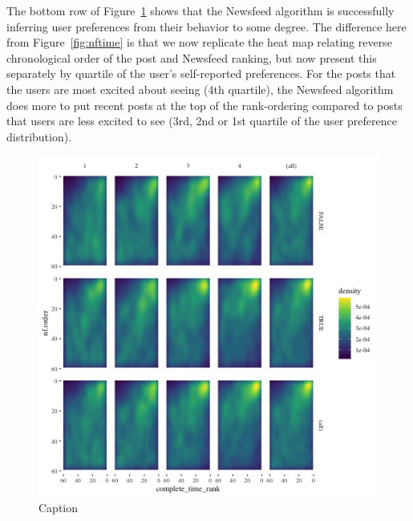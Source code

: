 \documentclass[12pt,letterpaper]{article}
\begin{document}
The bottom row of Figure~\ref{fig:nf_time_pref_group} shows that the Newsfeed algorithm is successfully inferring user preferences from their behavior to some degree. The difference here from Figure~\ref{fig:nftime} is that we now replicate the heat map relating reverse chronological order of the post and Newsfeed ranking, but now present this separately by quartile of the user's self-reported preferences.  For the posts that the users are most excited about seeing (4th quartile), the Newsfeed algorithm does more to put recent posts at the top of the rank-ordering compared to posts that users are less excited to see (3rd, 2nd or 1st quartile of the user preference distribution).

\begin{figure}[!h]
    \centering
    \includegraphics[scale=1]{Output/Graphs/Audit/Heatmaps/US NF chron rank by nf rank by norm quartile - smooth.jpg}
    \caption{Caption}
    \label{fig:nf_time_pref_group}
\end{figure}
\end{document}
